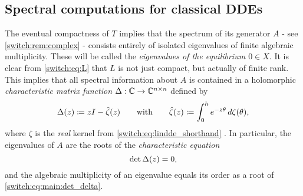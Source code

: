 \subsection{Spectral computations for classical DDEs}
 The eventual compactness of $T$ implies that the spectrum of its generator $A$ - see \cref{switch:rem:complex} - consists entirely of isolated eigenvalues of finite algebraic multiplicity. These will be called the \emph{eigenvalues of the equilibrium $0 \in X$}. It is clear from \cref{switch:eq:L} that $L$ is not just compact, but actually of finite rank. This implies that all spectral information about $A$ is contained in a holomorphic \emph{characteristic matrix function} $\Delta : \mathbb{C} \to \mathbb{C}^{n \times n}$ defined by
\begin{equation}
\label{switch:eq:CharMatrix}
  \Delta(z) \coloneqq zI - \hat{\zeta}(z) \qquad \text{with} \qquad \hat{\zeta}(z) \coloneqq \int_0^h{e^{-z\theta}\,d\zeta(\theta)},
\end{equation}
where $\zeta$ is the \emph{real} kernel from \cref{switch:eq:lindde_shorthand} \cite[Sections IV.4 and IV.5]{diekmann1995delay}. In particular, the eigenvalues of $A$ are the roots of the \emph{characteristic equation}
\begin{equation}
  \label{switch:eq:main:det_delta}
\operatorname{det}{\Delta(z)} = 0,
\end{equation}
and the algebraic multiplicity of an eigenvalue equals its order as a root of \cref{switch:eq:main:det_delta}.

